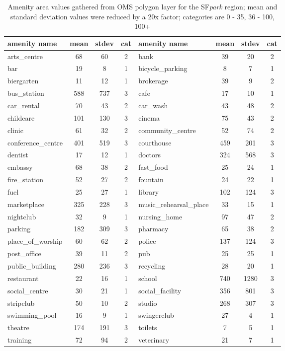 {\begin{table}[!ht]
	{\color{green}
	\footnotesize
	\begin{tabular}{ | l | c | c | c || l | c | c | c |}
		\hline		
		\textbf{amenity name} & \textbf{mean} & \textbf{stdev} & \textbf{cat} & \textbf{amenity name} & \textbf{mean} & \textbf{stdev} & \textbf{cat} \\ \hline
		arts\_centre & 68 & 60 & 2 & bank & 39 & 20 & 2 \\ \hline
		bar & 19 & 8 & 1 & bicycle\_parking & 8 & 7 & 1 \\ \hline
		biergarten & 11 & 12 & 1 & brokerage & 39 & 9 & 2 \\ \hline
		bus\_station & 588 & 737 & 3 & cafe & 17 & 10 & 1 \\ \hline
		car\_rental & 70 & 43 & 2 & car\_wash & 43 & 48 & 2 \\ \hline
		childcare & 101 & 130 & 3 & cinema & 75 & 43 & 2 \\ \hline
		clinic & 61 & 32 & 2 & community\_centre & 52 & 74 & 2 \\ \hline
		conference\_centre & 401 & 519 & 3 & courthouse & 459 & 201 & 3 \\ \hline
		dentist & 17 & 12 & 1 & doctors & 324 & 568 & 3 \\ \hline
		embassy & 68 & 38 & 2 & fast\_food & 25 & 24 & 1 \\ \hline
		fire\_station & 52 & 27 & 2 & fountain & 24 & 22 & 1 \\ \hline
		fuel & 25 & 27 & 1 & library & 102 & 124 & 3 \\ \hline
		marketplace & 325 & 228 & 3 & music\_rehearsal\_place & 33 & 15 & 1 \\ \hline
		nightclub & 32 & 9 & 1 & nursing\_home & 97 & 47 & 2 \\ \hline
		parking & 182 & 309 & 3 & pharmacy & 65 & 38 & 2 \\ \hline
		place\_of\_worship & 60 & 62 & 2 & police & 137 & 124 & 3 \\ \hline
		post\_office & 39 & 11 & 2 & pub & 25 & 25 & 1 \\ \hline
		public\_building & 280 & 236 & 3 & recycling & 28 & 20 & 1 \\ \hline
		restaurant & 22 & 16 & 1 & school & 740 & 1280 & 3 \\ \hline
		social\_centre & 30 & 21 & 1 & social\_facility & 356 & 801 & 3 \\ \hline
		stripclub & 50 & 10 & 2 & studio & 268 & 307 & 3 \\ \hline
		swimming\_pool & 16 & 9 & 1 & swingerclub & 27 & 4 & 1 \\ \hline
		theatre & 174 & 191 & 3 & toilets & 7 & 5 & 1 \\ \hline
		training & 72 & 94 & 2 & veterinary & 21 & 7 & 1 \\ \hline
	\end{tabular}
	\caption{\color{green} Amenity area values gathered from OMS polygon layer for the SF\textit{park} region; mean and standard deviation values were reduced by a 20x factor; categories are 0 - 35, 36 - 100, 100+}
	\label{extensions:amenity_area_values}}
\end{table}

}
